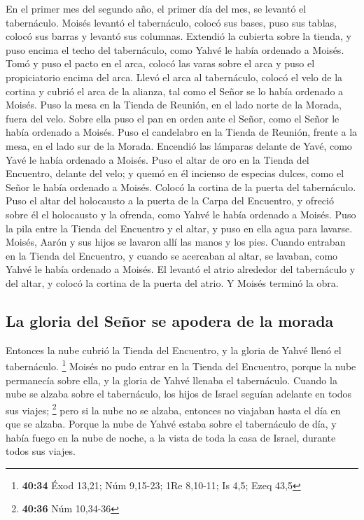  En el primer mes del segundo año, el primer día del mes,
se levantó el tabernáculo.  Moisés levantó el
tabernáculo, colocó sus bases, puso sus tablas, colocó sus barras y
levantó sus columnas.  Extendió la cubierta sobre la
tienda, y puso encima el techo del tabernáculo, como Yahvé le había
ordenado a Moisés.  Tomó y puso el pacto en el arca,
colocó las varas sobre el arca y puso el propiciatorio encima del arca.
 Llevó el arca al tabernáculo, colocó el velo de la
cortina y cubrió el arca de la alianza, tal como el Señor se lo había
ordenado a Moisés.  Puso la mesa en la Tienda de Reunión,
en el lado norte de la Morada, fuera del velo.  Sobre
ella puso el pan en orden ante el Señor, como el Señor le había ordenado
a Moisés.  Puso el candelabro en la Tienda de Reunión,
frente a la mesa, en el lado sur de la Morada.  Encendió
las lámparas delante de Yavé, como Yavé le había ordenado a Moisés.
 Puso el altar de oro en la Tienda del Encuentro, delante
del velo;  y quemó en él incienso de especias dulces,
como el Señor le había ordenado a Moisés.  Colocó la
cortina de la puerta del tabernáculo.  Puso el altar del
holocausto a la puerta de la Carpa del Encuentro, y ofreció sobre él el
holocausto y la ofrenda, como Yahvé le había ordenado a Moisés.
 Puso la pila entre la Tienda del Encuentro y el altar, y
puso en ella agua para lavarse.  Moisés, Aarón y sus
hijos se lavaron allí las manos y los pies.  Cuando
entraban en la Tienda del Encuentro, y cuando se acercaban al altar, se
lavaban, como Yahvé le había ordenado a Moisés.  El
levantó el atrio alrededor del tabernáculo y del altar, y colocó la
cortina de la puerta del atrio. Y Moisés terminó la obra.

\hypertarget{la-gloria-del-seuxf1or-se-apodera-de-la-morada}{%
\subsection{La gloria del Señor se apodera de la
morada}\label{la-gloria-del-seuxf1or-se-apodera-de-la-morada}}

 Entonces la nube cubrió la Tienda del Encuentro, y la
gloria de Yahvé llenó el tabernáculo. \footnote{\textbf{40:34} Éxod
  13,21; Núm 9,15-23; 1Re 8,10-11; Is 4,5; Ezeq 43,5} 
Moisés no pudo entrar en la Tienda del Encuentro, porque la nube
permanecía sobre ella, y la gloria de Yahvé llenaba el tabernáculo.
 Cuando la nube se alzaba sobre el tabernáculo, los hijos
de Israel seguían adelante en todos sus viajes; \footnote{\textbf{40:36}
  Núm 10,34-36}  pero si la nube no se alzaba, entonces
no viajaban hasta el día en que se alzaba.  Porque la
nube de Yahvé estaba sobre el tabernáculo de día, y había fuego en la
nube de noche, a la vista de toda la casa de Israel, durante todos sus
viajes.
